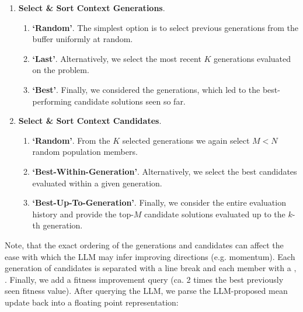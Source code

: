 \begin{enumerate}[resume]
    \item \textbf{Select \& Sort Context Generations}.
    \begin{enumerate}
        \item \textbf{`Random'}. The simplest option is to select previous generations from the buffer uniformly at random. 
        \item \textbf{`Last'}. Alternatively, we select the most recent $K$ generations evaluated on the problem.
        \item \textbf{`Best'}. Finally, we considered the generations, which led to the best-performing candidate solutions seen so far.
    \end{enumerate}
    \item \textbf{Select \& Sort Context Candidates}.
    \begin{enumerate}
        \item \textbf{`Random'}. From the $K$ selected generations we again select $M < N$ random population members.
        \item \textbf{`Best-Within-Generation'}. Alternatively, we select the best candidates evaluated within a given generation.
        \item \textbf{`Best-Up-To-Generation'}. Finally, we consider the entire evaluation history and provide the top-$M$ candidate solutions evaluated up to the $k$-th generation. 
    \end{enumerate}
\end{enumerate}
%
Note, that the exact ordering of the generations and candidates can affect the ease with which the LLM may infer improving directions (e.g. momentum). Each generation of candidates is separated with a line break and each member with a $,$. Finally, we add a fitness improvement query (ca. 2 times the best previously seen fitness value). After querying the LLM, we parse the LLM-proposed mean update back into a floating point representation:


